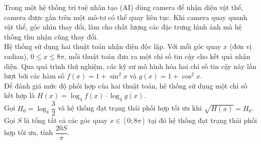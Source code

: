 \begin{ex}
	Trong một hệ thống trí tuệ nhân tạo (AI) dùng camera để nhận diện vật thể, camera được gắn trên một mô-tơ có thể quay liên tục. Khi camera quay quanh vật thể, góc nhìn thay đổi, làm cho chất lượng các đặc trưng hình ảnh mà hệ thống thu nhận cũng thay đổi.\\
	Hệ thống sử dụng hai thuật toán nhận diện độc lập. Với mỗi góc quay $x$ (đơn vị radian), $0\le x\le 8\pi$, mỗi thuật toán đưa ra một chỉ số tin cậy cho kết quả nhận diện. Qua quá trình thử nghiệm, các kỹ sư mô hình hóa hai chỉ số tin cậy này lần lượt bởi các hàm số $f(x)=1+\sin^2 x$ và $g(x)=1+\cos^2 x$.\\
	Để đánh giá mức độ phối hợp của hai thuật toán, hệ thống sử dụng một chỉ số kết hợp là $H(x)=\log_4 f(x)\cdot\log_4 g(x)$.\\
	Gọi $H_0=\log_4\dfrac{3}{2}$ và hệ thống đạt trạng thái phối hợp tối ưu khi $\sqrt{H(x)}=H_0$.\\
	Gọi $S$ là tổng tất cả các góc quay $x\in[0;8\pi]$ tại đó hệ thống đạt trạng thái phối hợp tối ưu, tính $\dfrac{20S}{\pi}$.
\end{ex}

